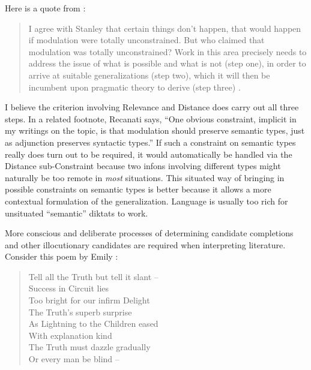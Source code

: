 Here is a quote from \citet[11]{recanati:tcp}:

\begin{quote}

I agree with Stanley that certain things don't happen, that would happen if modulation were totally unconstrained. But who claimed that modulation was totally unconstrained? Work in this area precisely needs to address the issue of what is possible and what is not (step one), in order to arrive at suitable generalizations (step two), which it will then be incumbent upon pragmatic theory to derive (step three) \citep{elbourne:ab}.

\end{quote}

I believe the criterion involving Relevance and Distance does carry out all three steps. In a related footnote, Recanati says, ``One obvious constraint, implicit in my writings on the topic, is that modulation should preserve semantic types, just as adjunction preserves syntactic types.'' If such a constraint on semantic types really does turn out to be required, it would automatically be handled via the Distance sub-Constraint because two infons involving different types might naturally be too remote in \emph{most} situations. This situated way of bringing in possible constraints on semantic types is better because it allows a more contextual formulation of the generalization. Language is usually too rich for unsituated ``semantic'' diktats to work.

More conscious and deliberate processes of determining candidate completions and other illocutionary candidates are required when interpreting literature. Consider this poem by Emily \citet[18]{dickinson:p}:


\begin{quote}
Tell all the Truth but tell it slant --\\
Success in Circuit lies\\
Too bright for our infirm Delight\\
The Truth's superb surprise\medskip\\
As Lightning to the Children eased\\
With explanation kind\\
The Truth must dazzle gradually\\
Or every man be blind --

\end{quote}


